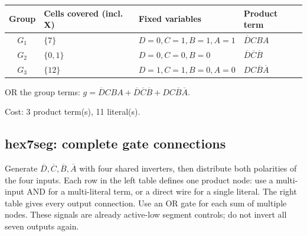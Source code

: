 \documentclass[a4paper,11pt]{article}
\begin{document}
\begin{minipage}{\textwidth}
\begin{center}\small
\begin{tabular}{clll}
\toprule
Group & Cells covered (incl. X) & Fixed variables & Product term\\\midrule
\textcolor{blue!75!black}{$G_{1}$} & $\{7\}$ & $D=0,C=1,B=1,A=1$ & $\overline{D}CBA$\\
\textcolor{red!75!black}{$G_{2}$} & $\{0,1\}$ & $D=0,C=0,B=0$ & $\overline{D}\overline{C}\overline{B}$\\
\textcolor{teal!80!black}{$G_{3}$} & $\{12\}$ & $D=1,C=1,B=0,A=0$ & $DC\overline{B}\overline{A}$\\
\bottomrule\end{tabular}\end{center}


\noindent OR the group terms: $\boxed{g=\overline{D}CBA + \overline{D}\overline{C}\overline{B} + DC\overline{B}\overline{A}}$.

\noindent Cost: 3 product term(s), 11 literal(s).

\end{minipage}\par\vspace{0.25cm}

\clearpage\subsection{hex7seg: complete gate connections}

Generate $\overline D,\overline C,\overline B,\overline A$ with four shared
inverters, then distribute both polarities of the four inputs. Each row in the left table
defines one product node: use a multi-input AND for a multi-literal term, or a direct wire
for a single literal. The right table gives every output connection. Use an OR gate for
each sum of multiple nodes. These signals are already active-low segment controls;
do not invert all seven outputs again.
\end{document}
